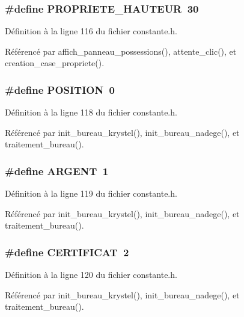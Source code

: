 \subsubsection{\setlength{\rightskip}{0pt plus 5cm}\#define PROPRIETE\_\-HAUTEUR~30}\label{constante_8h_989097ad5d30e49394d44f751be7a315}




D\'{e}finition \`{a} la ligne 116 du fichier constante.h.

R\'{e}f\'{e}renc\'{e} par affich\_\-panneau\_\-possessions(), attente\_\-clic(), et creation\_\-case\_\-propriete().
\subsubsection{\setlength{\rightskip}{0pt plus 5cm}\#define POSITION~0}\label{constante_8h_440f0e10bb28b153f5661c934bc6b89f}




D\'{e}finition \`{a} la ligne 118 du fichier constante.h.

R\'{e}f\'{e}renc\'{e} par init\_\-bureau\_\-krystel(), init\_\-bureau\_\-nadege(), et traitement\_\-bureau().
\subsubsection{\setlength{\rightskip}{0pt plus 5cm}\#define ARGENT~1}\label{constante_8h_daff423f9e1bdafe7cff410d236e0cea}




D\'{e}finition \`{a} la ligne 119 du fichier constante.h.

R\'{e}f\'{e}renc\'{e} par init\_\-bureau\_\-krystel(), init\_\-bureau\_\-nadege(), et traitement\_\-bureau().
\subsubsection{\setlength{\rightskip}{0pt plus 5cm}\#define CERTIFICAT~2}\label{constante_8h_8248bf65629aa0fb737cd2a960bd0b40}




D\'{e}finition \`{a} la ligne 120 du fichier constante.h.

R\'{e}f\'{e}renc\'{e} par init\_\-bureau\_\-krystel(), init\_\-bureau\_\-nadege(), et traitement\_\-bureau().

